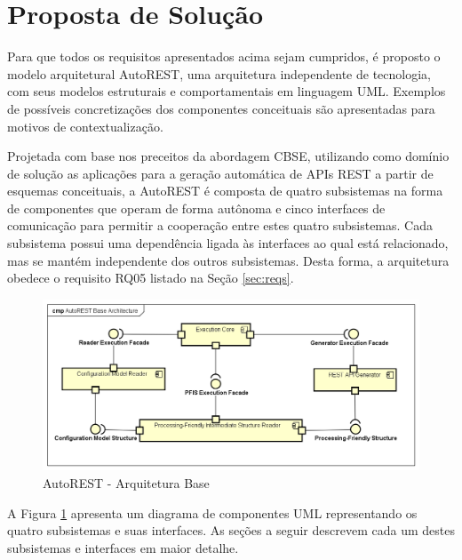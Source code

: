 
\section{Proposta de Solução}
\label{sec:propsol}

Para que todos os requisitos apresentados acima sejam cumpridos, é proposto o modelo arquitetural AutoREST, uma arquitetura independente de tecnologia, com seus modelos estruturais e comportamentais em linguagem UML. Exemplos de possíveis concretizações dos componentes conceituais são apresentadas para motivos de contextualização.

Projetada com base nos preceitos da abordagem CBSE, utilizando como domínio de solução as aplicações para a geração automática de APIs REST a partir de esquemas conceituais, a AutoREST é composta de quatro subsistemas na forma de componentes que operam de forma autônoma e cinco interfaces de comunicação para permitir a cooperação entre estes quatro subsistemas. Cada subsistema possui uma dependência ligada às interfaces ao qual está relacionado, mas se mantém independente dos outros subsistemas. Desta forma, a arquitetura obedece o requisito RQ05 listado na Seção \ref{sec:reqs}.

\begin{figure}[htb]
    \begin{center}
        \includegraphics[scale=0.57]{imagens/AutoREST_Base_Architecture.png}
    \end{center}
	\caption{\label{fig_aba}AutoREST - Arquitetura Base}
\end{figure}

A Figura \ref{fig_aba} apresenta um diagrama de componentes UML representando os quatro subsistemas e suas interfaces. As seções a seguir descrevem cada um destes subsistemas e interfaces em maior detalhe.

